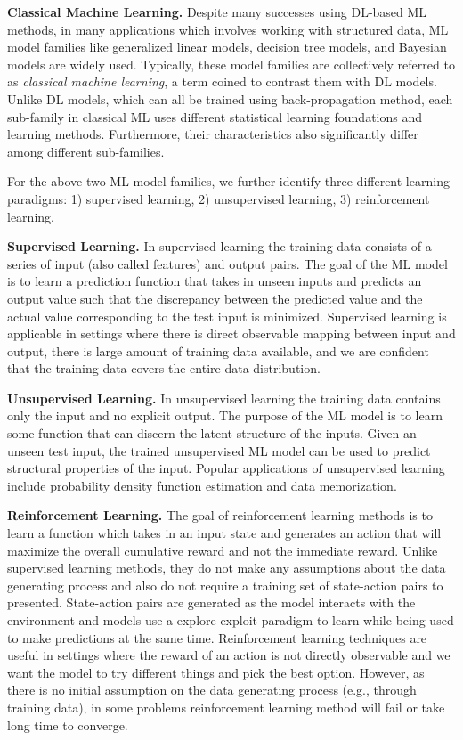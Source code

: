 \vspace{2mm}
\noindent \textbf{Classical Machine Learning. } Despite many successes using DL-based ML methods, in many applications which involves working with structured data, ML model families like generalized linear models, decision tree models, and Bayesian models are widely used.
Typically, these model families are collectively referred to as \textit{classical machine learning}, a term coined to contrast them with DL models.
Unlike DL models, which can all be trained using back-propagation method, each sub-family in classical ML uses different statistical learning foundations and learning methods.
Furthermore, their characteristics also significantly differ among different sub-families.

For the above two ML model families, we further identify three different learning paradigms: 1) supervised learning, 2) unsupervised learning, 3) reinforcement learning. 

\vspace{2mm}
\noindent \textbf{Supervised Learning. } In supervised learning the training data consists of a series of input (also called features) and output pairs.
The goal of the ML model is to learn a prediction function that takes in unseen inputs and predicts an output value such that the discrepancy between the predicted value and the actual value corresponding to the test input is minimized.
Supervised learning is applicable in settings where there is direct observable mapping between input and output, there is large amount of training data available, and we are confident that the training data covers the entire data distribution.

\vspace{2mm}
\noindent \textbf{Unsupervised Learning. } In unsupervised learning the training data contains only the input and no explicit output.
The purpose of the ML model is to learn some function that can discern the latent structure of the inputs.
Given an unseen test input, the trained unsupervised ML model can be used to predict structural properties of the input.
Popular applications of unsupervised learning include probability density function estimation and data memorization. 

\vspace{2mm}
\noindent \textbf{Reinforcement Learning. } The goal of reinforcement learning methods is to learn a function which takes in an input state and generates an action that will maximize the overall cumulative reward and not the immediate reward.
Unlike supervised learning methods, they do not make any assumptions about the data generating process and also do not require a training set of state-action pairs to presented.
State-action pairs are generated as the model interacts with the environment and models use a explore-exploit paradigm to learn while being used to make predictions at the same time.
Reinforcement learning techniques are useful in settings where the reward of an action is not directly observable and we want the model to try different things and pick the best option.
However, as there is no initial assumption on the data generating process (e.g., through training data), in some problems reinforcement learning method will fail or take long time to converge.
